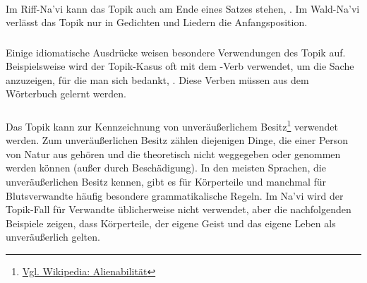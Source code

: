 \paragraph{} 
Im Riff-Na'vi kann das Topik auch am Ende eines Satzes stehen,  . Im Wald-Na'vi verlässt das Topik nur in Gedichten und Liedern die Anfangsposition. \Omaticon

\subsubsection{} Einige idiomatische Ausdrücke weisen besondere Verwendungen des Topik auf. Beispielsweise wird der Topik-Kasus oft mit dem -Verb   verwendet, um die Sache anzuzeigen, für die man sich bedankt,  . Diese Verben müssen aus dem Wörterbuch gelernt werden.

\subsubsection{}
\label{syn:topical:poss}
Das Topik kann zur Kennzeichnung von unveräußerlichem Besitz\footnote{\href{https://de.wikipedia.org/wiki/Alienabilität}{Vgl. Wikipedia: Alienabilität}} verwendet werden. Zum unveräußerlichen Besitz zählen diejenigen Dinge, die einer Person von Natur aus gehören und die theoretisch nicht weggegeben oder genommen werden können (außer durch Beschädigung). In den meisten Sprachen, die unveräußerlichen Besitz kennen, gibt es für Körperteile und manchmal für Blutsverwandte häufig besondere grammatikalische Regeln. Im Na'vi wird der Topik-Fall für Verwandte üblicherweise nicht verwendet, aber die nachfolgenden Beispiele zeigen, dass Körperteile, der eigene Geist und das eigene Leben als unveräußerlich gelten.


